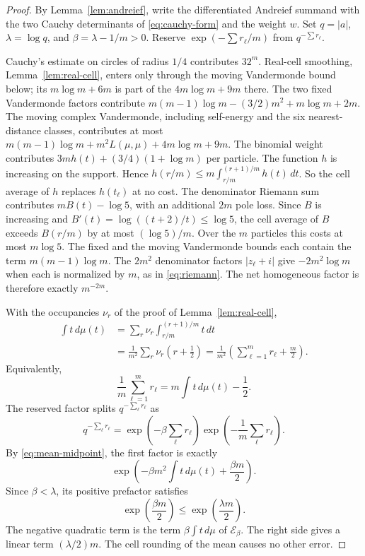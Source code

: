 \begin{proof}
By Lemma~\ref{lem:andreief}, write the differentiated Andreief summand with the two Cauchy determinants of \eqref{eq:cauchy-form} and the weight \(w\). Set \(q=|a|\), \(\lambda=\log q\), and \(\beta=\lambda-1/m>0\). Reserve \(\exp(-\sum r_\ell/m)\) from \(q^{-\sum r_\ell}\).

Cauchy's estimate on circles of radius \(1/4\) contributes \(32^m\). Real-cell smoothing, Lemma~\ref{lem:real-cell}, enters only through the moving Vandermonde bound below; its \(m\log m+6m\) is part of the \(4m\log m+9m\) there. The two fixed Vandermonde factors contribute \(m(m-1)\log m-(3/2)m^2+m\log m+2m\). The moving complex Vandermonde, including self-energy and the six nearest-distance classes, contributes at most \(m(m-1)\log m+m^2L(\mu,\mu)+4m\log m+9m\). The binomial weight contributes \(3mh(t)+(3/4)(1+\log m)\) per particle. The function \(h\) is increasing on the support. Hence \(h(r/m)\le m\int_{r/m}^{(r+1)/m}h(t)\,dt\). So the cell average of \(h\) replaces \(h(t_\ell)\) at no cost. The denominator Riemann sum contributes \(mB(t)-\log5\), with an additional \(2m\) pole loss. Since \(B\) is increasing and \(B'(t)=\log((t+2)/t)\le\log5\), the cell average of \(B\) exceeds \(B(r/m)\) by at most \((\log5)/m\). Over the \(m\) particles this costs at most \(m\log5\). The fixed and the moving Vandermonde bounds each contain the term \(m(m-1)\log m\). The \(2m^2\) denominator factors \(|z_\ell+i|\) give \(-2m^2\log m\) when each is normalized by \(m\), as in \eqref{eq:riemann}. The net homogeneous factor is therefore exactly \(m^{-2m}\).

With the occupancies \(\nu_r\) of the proof of Lemma~\ref{lem:real-cell},
\[
 \begin{aligned}
 \int t\,d\mu(t)
 &=\sum_r \nu_r\int_{r/m}^{(r+1)/m}t\,dt\\
 &=\frac1{m^2}\sum_r \nu_r\left(r+\frac12\right)
 =\frac1{m^2}\left(\sum_{\ell=1}^m r_\ell+\frac m2\right).
 \end{aligned}
\]
Equivalently,
\begin{equation}\label{eq:mean-midpoint}
 \frac1m\sum_{\ell=1}^m r_\ell
 =m\int t\,d\mu(t)-\frac12.
\end{equation}
The reserved factor splits \(q^{-\sum_\ell r_\ell}\) as
\[
 q^{-\sum_\ell r_\ell}
 =\exp\!\left(-\beta\sum_\ell r_\ell\right)
  \exp\!\left(-\frac1m\sum_\ell r_\ell\right).
\]
By \eqref{eq:mean-midpoint}, the first factor is exactly
\[
 \exp\!\left(-\beta m^2\int t\,d\mu(t)+\frac{\beta m}{2}\right).
\]
Since \(\beta<\lambda\), its positive prefactor satisfies
\[
 \exp\!\left(\frac{\beta m}{2}\right)\le\exp\!\left(\frac{\lambda m}{2}\right).
\]
The negative quadratic term is the term \(\beta\int t\,d\mu\) of \(\mathcal E_\beta\). The right side gives a linear term \((\lambda/2)m\). The cell rounding of the mean causes no other error.


\end{proof}
